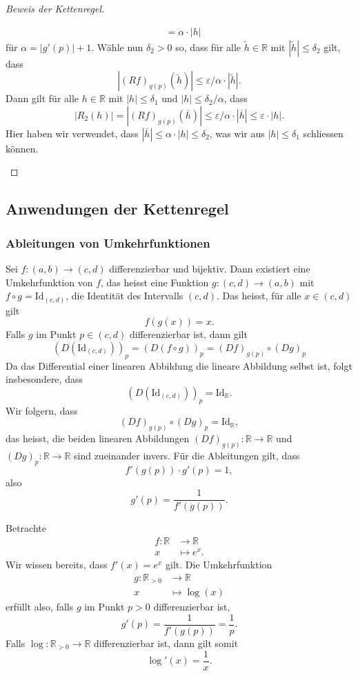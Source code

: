\documentclass[../main.tex]{subfiles}
\begin{document}
\begin{proof}[Beweis der Kettenregel]
\begin{enumerate}[(1)]
\begin{align*}
         &= \alpha \cdot |h|
      \end{align*}
      für $\alpha = |g'(p)| + 1$.
      Wähle nun $\delta_2 > 0$ so,
      dass für alle $\widetilde h \in \mathbb{R}$ 
      mit $|\widetilde h| \leq \delta_2$ gilt,
      dass
      \[
        |{(Rf)}_{g(p)}(\widetilde h)| \leq \varepsilon/\alpha
        \cdot |\widetilde h|.
      \]
      Dann gilt für alle $h \in \mathbb{R}$ mit
      $|h| \leq \delta_1$ und $|h| \leq \delta_2/\alpha$,
      dass
      \[
        |R_2(h)| = |{(Rf)}_{g(p)}(\overline h)|
        \leq \varepsilon/\alpha \cdot |\overline h| \leq
        \varepsilon \cdot |h|.
      \]
      Hier haben wir verwendet, dass
      $|\overline h| \leq \alpha \cdot |h| \leq \delta_2$,
      was wir aus $|h| \leq \delta_1$ schliessen
      können. \qedhere
  \end{enumerate}
\end{proof}

\subsection*{Anwendungen der Kettenregel}
\subsubsection*{Ableitungen von Umkehrfunktionen}
Sei $f \colon (a, b) \to (c, d)$ 
differenzierbar und bijektiv.
Dann existiert eine Umkehrfunktion
von $f$, das heisst eine Funktion
$g \colon (c, d) \to (a, b)$ 
mit $f \circ g = \text{Id}_{(c, d)}$,
die Identität des Intervalls
$(c, d)$. Das heisst, für alle
$x \in (c, d)$ gilt
\[
  f(g(x)) = x.
\]
Falls $g$ im Punkt $p \in (c, d)$
differenzierbar ist, dann gilt
\[
  {(D(\text{Id}_{(c, d)}))}_{p} = 
  {(D(f \circ g))}_p
  = {(Df)}_{g(p)} \circ {(Dg)}_p
\]
Da das Differential einer linearen Abbildung
die lineare Abbildung selbst ist,
folgt insbesondere, dass
\[
  {(D(\text{Id}_{(c, d)}))}_p = \text{Id}_{\mathbb{R}}.
\]
Wir folgern, dass
\[
  {(Df)}_{g(p)} \circ {(Dg)}_p = \text{Id}_{\mathbb{R}},
\]
das heisst, die beiden linearen Abbildungen
${(Df)}_{g(p)} \colon \mathbb{R} \to \mathbb{R}$
und ${(Dg)}_p \colon \mathbb{R} \to \mathbb{R}$ 
sind zueinander invers.
Für die Ableitungen gilt, dass
\[
  f'(g(p)) \cdot g'(p) = 1,
\]
also
\[
  g'(p) = \frac{1}{f'(g(p))}.
\]

\begin{example}
Betrachte
\begin{align*}
  f \colon \mathbb{R} & \to \mathbb{R} \\
  x & \mapsto e^x.
\end{align*}
Wir wissen bereits, dass $f'(x) = e^x$ gilt.
Die Umkehrfunktion
\begin{align*}
  g \colon \mathbb{R}_{>0} & \to \mathbb{R} \\
  x & \mapsto \log(x)
\end{align*}
erfüllt also, falls $g$ im Punkt $p > 0$ differenzierbar ist,
\[
  g'(p) = \frac{1}{f'(g(p))} = \frac{1}{p}.
\]
Falls $\log \colon \mathbb{R}_{>0} \to \mathbb{R}$ 
differenzierbar ist, dann gilt somit
\[
  \log'(x) = \frac{1}{x}.
\]
\end{example}
      
\end{document}
